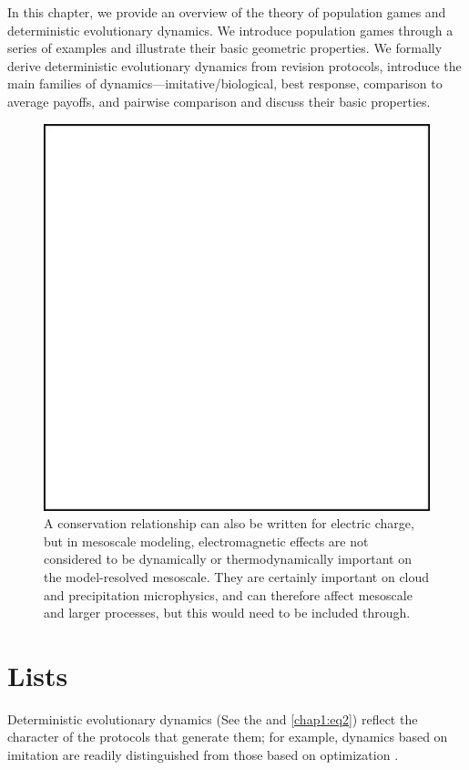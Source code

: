 \documentclass[onecolumn,authoryear]{els-mrw}
\begin{document}
In this chapter, we provide an overview of the theory of population games and deterministic evolutionary dynamics.  We introduce population games through a series of examples and illustrate their basic geometric properties.  We formally derive deterministic evolutionary dynamics from revision protocols, introduce the main families of dynamics---imitative/biological, best response, comparison to average payoffs, and pairwise comparison and discuss their basic properties.

\begin{figure}[t]
\centering
\includegraphics[width=.4\textwidth]{blankfig}
\caption{A conservation relationship can also be written for electric charge, but in mesoscale modeling, electromagnetic effects are not considered to be dynamically or thermodynamically important on the model-resolved mesoscale. They are certainly important on  cloud and precipitation microphysics, and can therefore affect mesoscale
and larger processes, but this would need to be included through.}
\label{chap1:fig1}
\end{figure}

\section{Lists}\label{chap1:sec5}%
Deterministic evolutionary dynamics (See the  and \eqref{chap1:eq2})  reflect the character of the protocols that generate them; for example, dynamics based on imitation are readily distinguished from those based on optimization \cite{bib5}.
\end{document}
